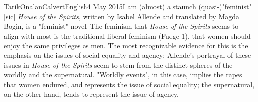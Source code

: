 \documentclass[12pt,a4paper]{article}
\begin{document}
    \begin{mla}{Tarik}{Onalan}{Calvert}{English}{4 May 2015}{I am (almost) a staunch (quasi-)"feminist" [sic]}
        \textit{House of the Spirits}, written by Isabel Allende and translated by Magda Bogin, is a
        "feminist" novel. The feminism that \textit{House of the Spirits} seems to align with most is
        the traditional liberal feminism (Fudge 1), that women should enjoy the same privileges as men.
        The most recognizable evidence for this is the emphasis on the issues of social equality and
        agency; Allende's portrayal of these issues in \textit{House of the Spirits} seem to stem from
        the distinct spheres of the worldly and the supernatural. "Worldly events", in this case, implies
        the rapes that women endured, and represents the issue of social equality; the supernatural,
        on the other hand, tends to represent the issue of agency.


\end{mla}
\end{document}
